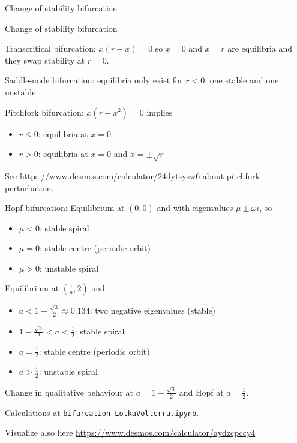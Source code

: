 \begin{solution}
\begin{slide}
\begin{parts}
	\item Change of stability bifurcation
	\item Change of stability bifurcation
	\item Transcritical bifurcation: $x(r-x) = 0$ so $x=0$ and $x=r$ are equilibria and they swap stability at $r=0$.
	\item Saddle-node bifurcation: equilibria only exist for $r<0$, one stable and one unstable.
	\item Pitchfork bifurcation: $x(r-x^2)=0$ implies
	\begin{itemize}
		\item $r\leq 0$: equilibria at $x=0$
		\item $r>0$: equilibria at $x=0$ and $x=\pm \sqrt{r}$
	\end{itemize}
	See \url{https://www.desmos.com/calculator/24dytsysw6} about pitchfork perturbation.
	\item Hopf bifurcation: Equilibrium at $(0,0)$ and with eigenvalues $\mu \pm \omega i$, so
	\begin{itemize}
		\item $\mu<0$: stable spiral
		\item $\mu = 0$: stable centre (periodic orbit)
		\item $\mu > 0$: unstable spiral
	\end{itemize}
	\item Equilibrium at $(\frac{1}{a},2)$ and
	\begin{itemize}
		\item $a < 1-\frac{\sqrt{3}}{2} \approx 0.134$: two negative eigenvalues (stable)
		\item $1-\frac{\sqrt{3}}{2}< a < \frac12$: stable spiral
		\item $ a = \frac12$: stable centre (periodic orbit)
		\item $ a > \frac12$: unstable spiral
	\end{itemize}
	
	Change in qualitative behaviour at $a = 1-\frac{\sqrt{3}}{2}$ and Hopf at $a = \frac12$.
	
	Calculations at \href{https://utoronto.syzygy.ca/jupyter/user-redirect/git-pull?repo=https://github.com/bigfatbernie/IBLMathModeling&subPath=book/python/bifurcation-LotkaVolterra.ipynb}{\tt bifurcation-LotkaVolterra.ipynb}.
	
	Visualize also here \url{https://www.desmos.com/calculator/aydzcpccy4}

\end{parts}
	
\end{slide}
	
\end{solution}








